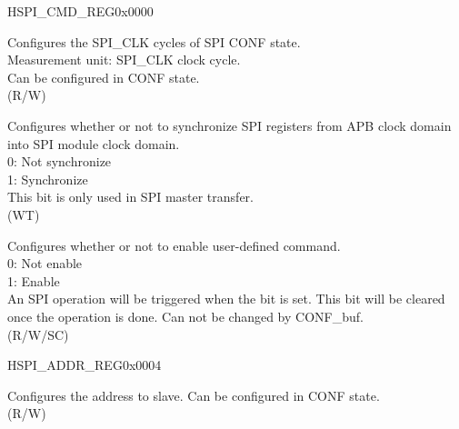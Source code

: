 \begin{register}{H}{SPI\_CMD\_REG}{0x0000}\label{regdesc:SPICMDREG}
%
%
%
%
%
\regnewline%
\begin{regdesc}\begin{reglist}
\label{fielddesc:SPICONFBITLEN}\item [SPI\_CONF\_BITLEN] Configures the SPI\_CLK cycles of SPI CONF state.\\
Measurement unit: SPI\_CLK clock cycle.\\
Can be configured in CONF state.\\
(R/W)
\label{fielddesc:SPIUPDATE}\item [SPI\_UPDATE] Configures whether or not to synchronize SPI registers from APB clock domain into SPI module clock domain. \\
0: Not synchronize \\
1: Synchronize \\
This bit is only used in SPI master transfer. \\
(WT)
\label{fielddesc:SPIUSR}\item [SPI\_USR] Configures whether or not to enable user-defined command. \\
0: Not enable \\
1: Enable \\
An SPI operation will be triggered when the bit is set. This bit will be cleared once the operation is done. Can not be changed by CONF\_buf.\\
(R/W/SC)
\end{reglist}\end{regdesc}
\end{register}


\begin{register}{H}{SPI\_ADDR\_REG}{0x0004}\label{regdesc:SPIADDRREG}
%
\regnewline%
\begin{regdesc}\begin{reglist}
\label{fielddesc:SPIUSRADDRVALUE}\item [SPI\_USR\_ADDR\_VALUE] Configures the address to slave.
Can be configured in CONF state. \\
(R/W)
\end{reglist}\end{regdesc}
\end{register}


